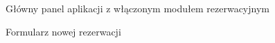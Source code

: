 \documentclass[a4paper,onecolumn,oneside,11pt,wide,floatssmall]{mwrep}
\theoremstyle{definition}
\theoremstyle{plain}%
\theoremstyle{remark}
\begin{document}
\begin{figure}[H]
  \begin{center}
  \end{center}
  \caption{Główny panel aplikacji z włączonym modułem rezerwacyjnym}
  \label{fig:mockups-main-panel}
\end{figure}

\begin{figure}[H]
  \begin{center}
  \end{center}
  \caption{Formularz nowej rezerwacji}
  \label{fig:mockups-new-reservation}
\end{figure}
\end{document}
